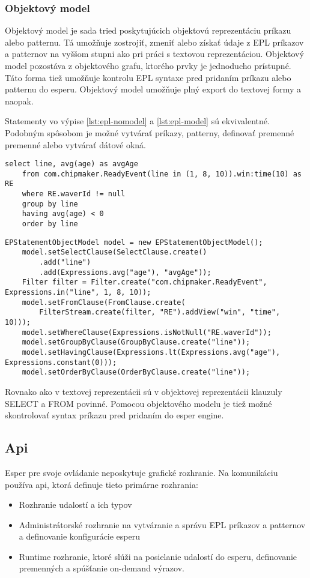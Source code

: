 		
				
		\subsubsection{Objektový model}	
		Objektový model je sada tried poskytujúcich objektovú reprezentáciu príkazu alebo patternu. Tá umožňuje zostrojiť, zmeniť alebo získať údaje z EPL príkazov a patternov na vyššom stupni ako pri práci s textovou reprezentáciou. Objektový model pozostáva z objektového grafu, ktorého prvky je jednoducho prístupné. Táto forma tiež umožňuje kontrolu EPL syntaxe pred pridaním príkazu alebo patternu do esperu. Objektový model umožňuje plný export do textovej formy a naopak.
		
		Statementy vo výpise \ref{lst:epl-nomodel} a \ref{lst:epl-model} sú ekvivalentné. Podobným spôsobom je možné vytvárať príkazy, patterny, definovať premenné premenné alebo vytvárať dátové okná.
		
		\begin{lstlisting}[label=lst:epl-nomodel,caption=EPL príkaz bez použitia objektového modelu]
	select line, avg(age) as avgAge 
	from com.chipmaker.ReadyEvent(line in (1, 8, 10)).win:time(10) as RE
	where RE.waverId != null
	group by line 
	having avg(age) < 0
	order by line
		\end{lstlisting}
		
		\begin{lstlisting}[float,label=lst:epl-model,caption=EPL príkaz s použitím objektového modelu]
	EPStatementObjectModel model = new EPStatementObjectModel();
	model.setSelectClause(SelectClause.create()
		.add("line")
		.add(Expressions.avg("age"), "avgAge"));
	Filter filter = Filter.create("com.chipmaker.ReadyEvent", Expressions.in("line", 1, 8, 10));
	model.setFromClause(FromClause.create(
		FilterStream.create(filter, "RE").addView("win", "time", 10)));
	model.setWhereClause(Expressions.isNotNull("RE.waverId"));
	model.setGroupByClause(GroupByClause.create("line"));
	model.setHavingClause(Expressions.lt(Expressions.avg("age"), Expressions.constant(0)));
	model.setOrderByClause(OrderByClause.create("line"));
		\end{lstlisting}
	
		Rovnako ako v textovej reprezentácii sú v objektovej reprezentácii klauzuly SELECT a FROM povinné. Pomocou objektového modelu je tiež možné skontrolovať syntax príkazu pred pridaním do esper engine.
		
	\subsection{Api}
		Esper pre svoje ovládanie neposkytuje grafické rozhranie. Na komunikáciu používa api, ktorá definuje tieto primárne rozhrania:
		\begin{itemize}
			\item Rozhranie udalostí a ich typov
			\item Administrátorské rozhranie na vytváranie a správu EPL príkazov a patternov a definovanie konfigurácie esperu
			\item Runtime rozhranie, ktoré slúži na posielanie udalostí do esperu, definovanie premenných a spúšťanie on-demand výrazov.
		\end{itemize}
		
